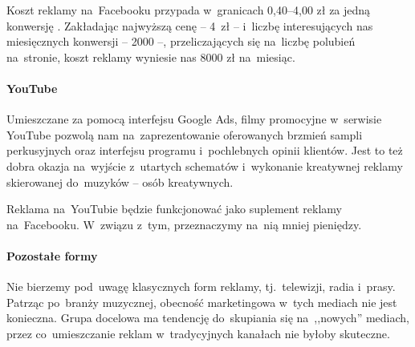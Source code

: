 \documentclass[12pt]{article}
\begin{document}
Koszt reklamy na~Facebooku przypada w~granicach 0,40--4,00 zł za jedną konwersję \cite{facebook}.
Zakładając najwyższą cenę -- 4~zł -- i~liczbę interesujących nas miesięcznych konwersji -- 2000 --, przeliczających się na~liczbę polubień na~stronie, koszt reklamy wyniesie nas 8000 zł na~miesiąc.

\paragraph{YouTube}

Umieszczane za pomocą interfejsu Google Ads, filmy promocyjne w~serwisie YouTube pozwolą nam na~zaprezentowanie oferowanych brzmień sampli perkusyjnych oraz interfejsu programu i~pochlebnych opinii klientów.
Jest to też dobra okazja na~wyjście z~utartych schematów i~wykonanie kreatywnej reklamy skierowanej do~muzyków -- osób kreatywnych.

Reklama na~YouTubie będzie funkcjonować jako suplement reklamy na~Facebooku.
W~związu z~tym, przeznaczymy na~nią mniej pieniędzy.



\paragraph{Pozostałe formy}

Nie bierzemy pod~uwagę klasycznych form reklamy, tj.~telewizji, radia i~prasy.
Patrząc po~branży muzycznej, obecność marketingowa w~tych mediach nie jest konieczna.
Grupa docelowa ma tendencję do~skupiania się na~,,nowych'' mediach, przez co~umieszczanie reklam w~tradycyjnych kanałach nie byłoby skuteczne.
\end{document}
